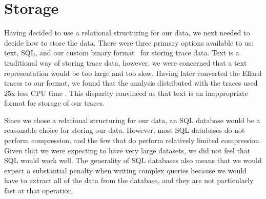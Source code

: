 \section{Storage}
\label{sec:storage}

Having decided to use a relational structuring for our data, we next
needed to decide how to store the data.  There were three primary
options available to us: text, SQL, and our custom binary
format~\cite{DSTechnicalReportSnapshot} for storing trace data.  Text
is a traditional way of storing trace data, however, we were concerned
that a text representation would be too large and too slow.  Having
later converted the Ellard traces to our format, we found that the
analysis distributed with the traces used 25x less CPU time .  This
disparity convinced us that text is an inappropriate format for
storage of our traces.


Since we chose a relational structuring for our data, an SQL database
would be a reasonable choice for storing our data.  However, most SQL
databases do not perform compression, and the few that do perform
relatively limited compression. Given that we were expecting to have
very large datasets, we did not feel that SQL would work well.  The
generality of SQL databases also means that we would expect a
substantial penalty when writing complex queries because we would have
to extract all of the data from the database, and they are not
particularly fast at that operation.

